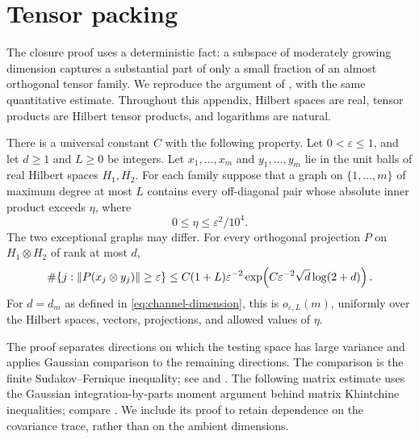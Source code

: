 \section{Tensor packing}\label{sec:packing}

The closure proof uses a deterministic fact: a subspace of moderately
growing dimension captures a substantial part of only a small fraction
of an almost orthogonal tensor family.  We reproduce the argument of
\cite[Theorem~4.1]{FourfoldCompanion}, with the same quantitative
estimate.  Throughout this appendix, Hilbert spaces are real, tensor
products are Hilbert tensor products, and logarithms are natural.

\begin{theorem}\label{thm:packing}
There is a universal constant $C$ with the following property.  Let
$0<\varepsilon\le1$, and let $d\ge1$ and $L\ge0$ be integers.
Let $x_1,\ldots,x_m$ and $y_1,\ldots,y_m$ lie in the unit balls of
real Hilbert spaces $H_1,H_2$.  For each family suppose that a graph
on $\{1,\ldots,m\}$ of maximum degree at most $L$ contains every
off-diagonal pair whose absolute inner product exceeds $\eta$, where
\[
 0\le\eta\le\varepsilon^2/10^4.
\]
The two exceptional graphs may differ.  For every orthogonal projection
$P$ on $H_1\otimes H_2$ of rank at most $d$,
\begin{equation}\label{eq:packing-quantitative}
 \#\{j:\lVert P(x_j\otimes y_j)\rVert\ge\varepsilon\}
 \le C(1+L)\varepsilon^{-2}
       \exp\!\left(C\varepsilon^{-2}\sqrt d\log(2+d)\right).
\end{equation}
For $d=d_m$ as defined in \eqref{eq:channel-dimension}, this is
$o_{\varepsilon,L}(m)$, uniformly over the Hilbert spaces, vectors,
projections, and allowed values of $\eta$.
\end{theorem}

The proof separates directions on which the testing space has large
variance and applies Gaussian comparison to the remaining directions.
The comparison is the finite Sudakov--Fernique inequality; see
\cite[Section~1, Equation~(1.2)]{Fernique1974} and
\cite{Sudakov1971}.  The following matrix estimate uses the Gaussian
integration-by-parts moment argument behind matrix Khintchine
inequalities; compare \cite[Lemma~6.1 and Proposition~7.3]{Tropp2018}.
We include its proof to retain dependence on the covariance trace,
rather than on the ambient dimensions.

